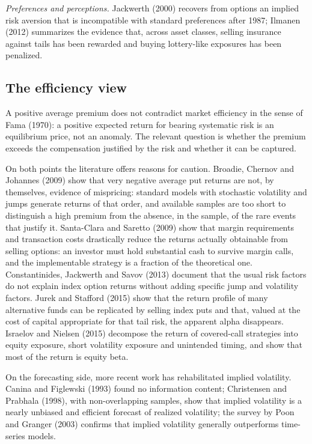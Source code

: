 \documentclass[11pt,a4paper]{article}
\begin{document}
\emph{Preferences and perceptions.} Jackwerth (2000) recovers from options an implied risk aversion that is incompatible with standard preferences after 1987; Ilmanen (2012) summarizes the evidence that, across asset classes, selling insurance against tails has been rewarded and buying lottery-like exposures has been penalized.

\subsection{The efficiency view}

A positive average premium does not contradict market efficiency in the sense of Fama (1970): a positive expected return for bearing systematic risk is an equilibrium price, not an anomaly. The relevant question is whether the premium exceeds the compensation justified by the risk and whether it can be captured.

On both points the literature offers reasons for caution. Broadie, Chernov and Johannes (2009) show that very negative average put returns are not, by themselves, evidence of mispricing: standard models with stochastic volatility and jumps generate returns of that order, and available samples are too short to distinguish a high premium from the absence, in the sample, of the rare events that justify it. Santa-Clara and Saretto (2009) show that margin requirements and transaction costs drastically reduce the returns actually obtainable from selling options: an investor must hold substantial cash to survive margin calls, and the implementable strategy is a fraction of the theoretical one. Constantinides, Jackwerth and Savov (2013) document that the usual risk factors do not explain index option returns without adding specific jump and volatility factors. Jurek and Stafford (2015) show that the return profile of many alternative funds can be replicated by selling index puts and that, valued at the cost of capital appropriate for that tail risk, the apparent alpha disappears. Israelov and Nielsen (2015) decompose the return of covered-call strategies into equity exposure, short volatility exposure and unintended timing, and show that most of the return is equity beta.

On the forecasting side, more recent work has rehabilitated implied volatility. Canina and Figlewski (1993) found no information content; Christensen and Prabhala (1998), with non-overlapping samples, show that implied volatility is a nearly unbiased and efficient forecast of realized volatility; the survey by Poon and Granger (2003) confirms that implied volatility generally outperforms time-series models.
\end{document}
